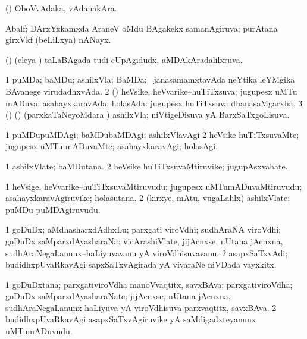 \bentry
{}
\gl{\nA}
\bmng
(\saM) OboVvAdaka, vAdanakAra. 
\emng
\eentry

\bentry
{}
\gl{\nA}
\bmng
Abalf; DArxYxkamxda AraneV oMdu BAgakekx samanAgiruva; purAtana girxVkf (beLiLxya) nANayx. 
\emng
\eentry

\bentry
{}
\gl{\gu}
\bmng
(\jiVvi) (eleya \vi) taLaBAgada tudi cUpAgidudx, aMDAkAradalilxruva. 
\emng
\eentry

\bentry
{}
\gl{\gu}
\bmng
\bnum
\num{1} puMDa; baMDu; ashilxVla; BaMDa; \kanmu\ janasamamxtavAda neYtika leYMgika BAvanege virudadhxvAda. 
\num{2} (\AmA) heVsike, heVvarike--huTiTxsuva; jugupesx uMTu mADuva; asahayxkaravAda; holasAda:  jugupesx huTiTxsuva dhanasaMgarxha. 
\num{3} (\birx) (\nAyxshA) (parxkaTaNeyoMdara \vi) ashilxVla; niVtigeDisuva yA BarxSaTxgoLisuva. 
\enum
\emng
\eentry

\bentry
{}
\gl{\kirxvi}
\bmng
% 
\bnum
\num{1} puMDupuMDAgi; baMDubaMDAgi; ashilxVlavAgi 
\num{2} heVsike huTiTxsuvaMte; jugupesx uMTu mADuvaMte; asahayxkaravAgi; holasAgi. 
\enum
\emng
\eentry

\bentry
{}
\gl{\nA}
\bmng
% 
\bnum
\num{1} ashilxVlate; baMDutana. 
\num{2} heVsike huTiTxsuvaMtiruvike; jugupAsxvahate. 
\enum
\emng
\eentry

\bentry
{}
\gl{\nA}
\bmng
% 
\bnum
\num{1} heVsige, heVvarike--huTiTxsuvaMtiruvudu; jugupesx uMTumADuvaMtiruvudu; asahayxkaravAgiruvike; holasutana. 
\num{2} (kirxye, mAtu, \mo vugaLalilx) ashilxVlate; puMDu puMDAgiruvudu. 
\enum
\emng
\eentry

\bentry
{}
\gl{\nA}
\bmng
% 
\bnum
\num{1} goDuDx; aMdhasharxdAdhxLu; parxgati viroVdhi; sudhAraNA viroVdhi; goDuDx saMparxdAyasharaNa; vicArashiVlate, jijAcnxse, nUtana jAcnxna, sudhAraNegaLanunx--haLiyuvavanu yA viroVdhisuvavanu. 
\num{2} asapxSaTxvAdi; budidhxpUvaRkavAgi sapxSaTxvAgirada yA vivaraNe niVDada vayxkitx. 
\enum
\emng
\eentry

\bentry
{}
\gl{\nA}
\bmng
% 
\bnum
\num{1} goDuDxtana; parxgativiroVdha manoVvaqtitx, savxBAva; parxgativiroVdha; goDuDx saMparxdAyasharaNate; jijAcnxse, nUtana jAcnxna, sudhAraNegaLanunx haLiyuva yA viroVdhisuva parxvaqtitx, savxBAva. 
\num{2} budidhxpUvaRkavAgi asapxSaTxvAgiruvike yA saMdigadxteyanunx uMTumADuvudu. 
\enum
\emng
\eentry


